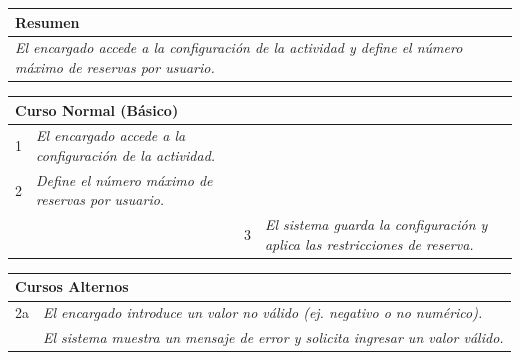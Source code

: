\begin{table}[H]
    \begin{tabular}{llllllll}
    \hline
    \multicolumn{8}{|l|}{\cellcolor[HTML]{F2F2F2}Resumen} \\ \hline
    \multicolumn{8}{|p{15cm}|}{{\color[HTML]{808080} \textit{El encargado accede a la configuración de la actividad y define el número máximo de reservas por usuario.}}} \\ \hline
    \end{tabular}
\end{table}

\begin{table}[H]
    \begin{tabular}{llllllll}
    \hline
    \multicolumn{8}{|l|}{\cellcolor[HTML]{F2F2F2}Curso Normal (Básico)} \\ \hline
    \multicolumn{1}{|c|}{1} & \multicolumn{1}{p{6cm}|}{{\color[HTML]{808080} \textit{El encargado accede a la configuración de la actividad.}}} & \multicolumn{1}{c|}{} & \multicolumn{5}{p{6cm}|}{{\color[HTML]{808080} \textit{}}} \\ \hline
    \multicolumn{1}{|c|}{2} & \multicolumn{1}{p{6cm}|}{{\color[HTML]{808080} \textit{Define el número máximo de reservas por usuario.}}} & \multicolumn{1}{c|}{} & \multicolumn{5}{p{6cm}|}{{\color[HTML]{808080} \textit{}}} \\ \hline
    \multicolumn{1}{|c|}{} & \multicolumn{1}{p{6cm}|}{{\color[HTML]{808080} \textit{}}} & \multicolumn{1}{c|}{3} & \multicolumn{5}{p{6cm}|}{{\color[HTML]{808080} \textit{El sistema guarda la configuración y aplica las restricciones de reserva.}}} \\ \hline
    \end{tabular}
\end{table}

\begin{table}[H]
    \begin{tabular}{llllllll}
    \hline
    \multicolumn{8}{|l|}{\cellcolor[HTML]{F2F2F2}Cursos Alternos} \\ \hline
    \multicolumn{1}{|c|}{2a} & \multicolumn{7}{l|}{{\color[HTML]{808080} \textit{El encargado introduce un valor no válido (ej. negativo o no numérico).}}} \\ \hline
    \multicolumn{1}{|c|}{} & \multicolumn{7}{l|}{{\color[HTML]{808080} \textit{El sistema muestra un mensaje de error y solicita ingresar un valor válido.}}} \\ \hline
    \end{tabular}
\end{table}

